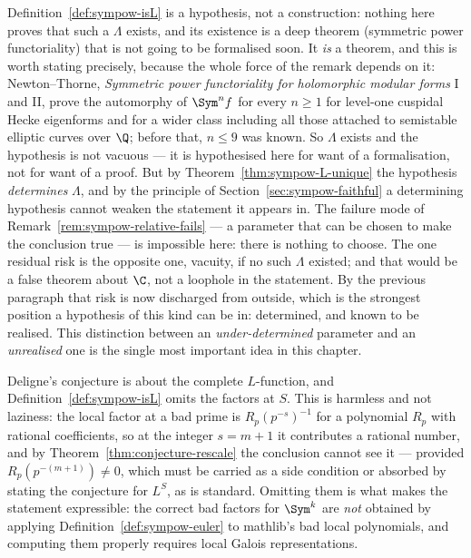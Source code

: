 \begin{remark}
  \label{rem:L-determined}
  Definition~\ref{def:sympow-isL} is a hypothesis, not a construction: nothing here proves
  that such a $\Lambda$ exists, and its existence is a deep theorem
  (symmetric power functoriality) that is not going to be formalised soon. It \emph{is} a
  theorem, and this is worth stating precisely, because the whole force of the remark depends
  on it: Newton--Thorne, \emph{Symmetric power functoriality for holomorphic modular forms}
  I and II, prove the automorphy of $\Sym^{n}f$ for every $n \geq 1$ for level-one cuspidal
  Hecke eigenforms and for a wider class including all those attached to semistable elliptic
  curves over $\Q$; before that, $n \leq 9$ was known. So $\Lambda$ exists and the hypothesis
  is not vacuous --- it is hypothesised here for want of a formalisation, not for want of a
  proof. But by
  Theorem~\ref{thm:sympow-L-unique} the hypothesis \emph{determines} $\Lambda$, and by the
  principle of Section~\ref{sec:sympow-faithful} a determining hypothesis cannot weaken the
  statement it appears in. The failure mode of Remark~\ref{rem:sympow-relative-fails} --- a
  parameter that can be chosen to make the conclusion true --- is impossible here: there is
  nothing to choose. The one residual risk is the opposite one, vacuity, if no such $\Lambda$
  existed; and that would be a false theorem about $\C$, not a loophole in the statement.
  By the previous paragraph that risk is now discharged from outside, which is the strongest
  position a hypothesis of this kind can be in: determined, and known to be realised.
  This distinction between an \emph{under-determined} parameter and an \emph{unrealised} one
  is the single most important idea in this chapter.
\end{remark}

\begin{remark}
  \label{rem:bad-factors}
  Deligne's conjecture is about the complete $L$-function, and
  Definition~\ref{def:sympow-isL} omits the factors at $S$. This is harmless and not laziness:
  the local factor at a bad prime is $R_{p}(p^{-s})^{-1}$ for a polynomial $R_{p}$ with
  rational coefficients, so at the integer $s=m+1$ it contributes a rational number, and by
  Theorem~\ref{thm:conjecture-rescale} the conclusion cannot see it --- provided
  $R_{p}(p^{-(m+1)}) \neq 0$, which must be carried as a side condition or absorbed by
  stating the conjecture for $L^{S}$, as is standard. Omitting them is what makes the
  statement expressible: the correct bad factors for $\Sym^{k}$ are \emph{not} obtained by
  applying Definition~\ref{def:sympow-euler} to mathlib's bad local polynomials, and
  computing them properly requires local Galois representations.
\end{remark}

